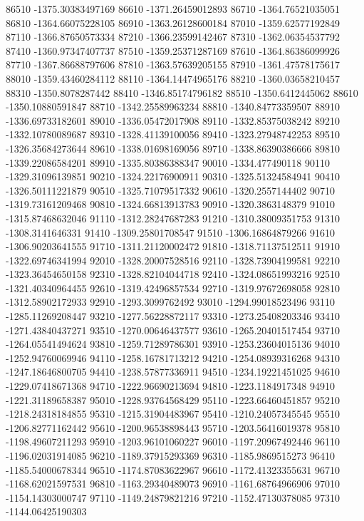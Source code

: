 {86510 -1375.30383497169
86610 -1371.26459012893
86710 -1364.76521035051
86810 -1364.66075228105
86910 -1363.26128600184
87010 -1359.62577192849
87110 -1366.87650573334
87210 -1366.23599142467
87310 -1362.06354537792
87410 -1360.97347407737
87510 -1359.25371287169
87610 -1364.86386099926
87710 -1367.86688797606
87810 -1363.57639205155
87910 -1361.47578175617
88010 -1359.43460284112
88110 -1364.14474965176
88210 -1360.03658210457
88310 -1350.8078287442
88410 -1346.85174796182
88510 -1350.6412445062
88610 -1350.10880591847
88710 -1342.25589963234
88810 -1340.84773359507
88910 -1336.69733182601
89010 -1336.05472017908
89110 -1332.85375038242
89210 -1332.10780089687
89310 -1328.41139100056
89410 -1323.27948742253
89510 -1326.35684273644
89610 -1338.01698169056
89710 -1338.86390386666
89810 -1339.22086584201
89910 -1335.80386388347
90010 -1334.477490118
90110 -1329.31096139851
90210 -1324.22176900911
90310 -1325.51324584941
90410 -1326.50111221879
90510 -1325.71079517332
90610 -1320.2557144402
90710 -1319.73161209468
90810 -1324.66813913783
90910 -1320.3863148379
91010 -1315.87468632046
91110 -1312.28247687283
91210 -1310.38009351753
91310 -1308.3141646331
91410 -1309.25801708547
91510 -1306.16864879266
91610 -1306.90203641555
91710 -1311.21120002472
91810 -1318.71137512511
91910 -1322.69746341994
92010 -1328.20007528516
92110 -1328.73904199581
92210 -1323.36454650158
92310 -1328.82104044718
92410 -1324.08651993216
92510 -1321.40340964455
92610 -1319.42496857534
92710 -1319.97672698058
92810 -1312.58902172933
92910 -1293.3099762492
93010 -1294.99018523496
93110 -1285.11269208447
93210 -1277.56228872117
93310 -1273.25408203346
93410 -1271.43840437271
93510 -1270.00646437577
93610 -1265.20401517454
93710 -1264.05541494624
93810 -1259.71289786301
93910 -1253.23604015136
94010 -1252.94760069946
94110 -1258.16781713212
94210 -1254.08939316268
94310 -1247.18646800705
94410 -1238.57877336911
94510 -1234.19221451025
94610 -1229.07418671368
94710 -1222.96690213694
94810 -1223.1184917348
94910 -1221.31189658387
95010 -1228.93764568429
95110 -1223.66460451857
95210 -1218.24318184855
95310 -1215.31904483967
95410 -1210.24057345545
95510 -1206.82771162442
95610 -1200.96538898443
95710 -1203.56416019378
95810 -1198.49607211293
95910 -1203.96101060227
96010 -1197.20967492446
96110 -1196.02031914085
96210 -1189.37915293369
96310 -1185.9869515273
96410 -1185.54000678344
96510 -1174.87083622967
96610 -1172.41323355631
96710 -1168.62021597531
96810 -1163.29340489073
96910 -1161.68764966906
97010 -1154.14303000747
97110 -1149.24879821216
97210 -1152.47130378085
97310 -1144.06425190303
}
